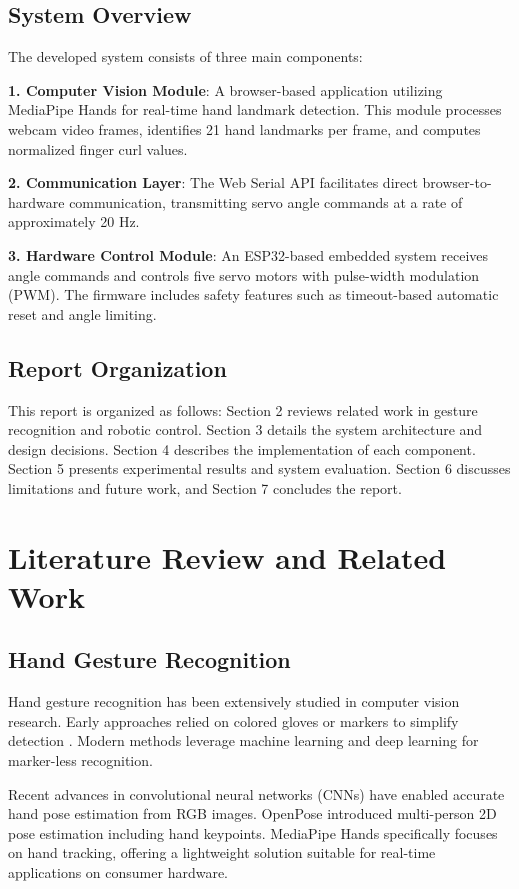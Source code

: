 \documentclass[12pt]{article}
\begin{document}
\subsection{System Overview}

The developed system consists of three main components:

\textbf{1. Computer Vision Module}: A browser-based application utilizing MediaPipe Hands for real-time hand landmark detection. This module processes webcam video frames, identifies 21 hand landmarks per frame, and computes normalized finger curl values.

\textbf{2. Communication Layer}: The Web Serial API facilitates direct browser-to-hardware communication, transmitting servo angle commands at a rate of approximately 20 Hz.

\textbf{3. Hardware Control Module}: An ESP32-based embedded system receives angle commands and controls five servo motors with pulse-width modulation (PWM). The firmware includes safety features such as timeout-based automatic reset and angle limiting.

\subsection{Report Organization}

This report is organized as follows: Section 2 reviews related work in gesture recognition and robotic control. Section 3 details the system architecture and design decisions. Section 4 describes the implementation of each component. Section 5 presents experimental results and system evaluation. Section 6 discusses limitations and future work, and Section 7 concludes the report.

\section{Literature Review and Related Work}

\subsection{Hand Gesture Recognition}

Hand gesture recognition has been extensively studied in computer vision research. Early approaches relied on colored gloves or markers to simplify detection \cite{glove_based}. Modern methods leverage machine learning and deep learning for marker-less recognition.

Recent advances in convolutional neural networks (CNNs) have enabled accurate hand pose estimation from RGB images. OpenPose \cite{openpose} introduced multi-person 2D pose estimation including hand keypoints. MediaPipe Hands \cite{mediapipe_hands} specifically focuses on hand tracking, offering a lightweight solution suitable for real-time applications on consumer hardware.
\end{document}
